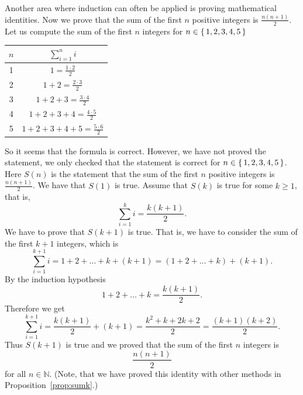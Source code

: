 Another area where induction can often be applied is proving mathematical identities. Now we prove that the sum of the first $n$ positive 
integers is $\frac{n(n+1)}{2}$. Let us compute the sum of the first $n$ integers for $n\in\left\{\,1,2,3,4,5\,\right\}$
\begin{center}
\begin{tabular}{|c|c|}
\hline
$n$ & $\sum_{i=1}^n i$\\
\hline
1 & $1=\frac{1\cdot 2}{2}$\\
\hline
2 & $1+2=\frac{2\cdot 3}{2}$\\
\hline
3 & $1+2+3=\frac{3\cdot 4}{2}$\\
\hline
4 & $1+2+3+4=\frac{4\cdot 5}{2}$\\
\hline
5 & $1+2+3+4+5=\frac{5\cdot 6}{2}$\\
\hline
\end{tabular}
\end{center}
So it seems that the formula is correct. However, we have not proved the statement, we only checked that the statement is correct for $n\in\left\{\,1,2,3,4,5\,\right\}$.
Here $S(n)$ is the statement that the sum of the first $n$ positive integers is $\frac{n(n+1)}{2}$. We have that $S(1)$ is true. Assume that $S(k)$ is true
for some $k\geq 1$, that is, 
$$
\sum_{i=1}^k i=\frac{k(k+1)}{2}.
$$
We have to prove that $S(k+1)$ is true. That is, we have to consider the sum of the first $k+1$ integers, which is
$$
\sum_{i=1}^{k+1} i =1+2+\ldots+k+(k+1)=(1+2+\ldots+k)+(k+1).
$$
By the induction hypothesis 
$$
1+2+\ldots+k=\frac{k(k+1)}{2}.
$$
Therefore we get
$$
\sum_{i=1}^{k+1} i =\frac{k(k+1)}{2}+(k+1)=\frac{k^2+k+2k+2}{2}=\frac{(k+1)(k+2)}{2}.
$$
Thus $S(k+1)$ is true and we proved that the sum of the first $n$ integers is 
$$
\frac{n(n+1)}{2}
$$
for all $n\in\mathbb{N}$.
(Note, that we have proved this identity with other methods in Proposition~\ref{prop:sumk}.)

